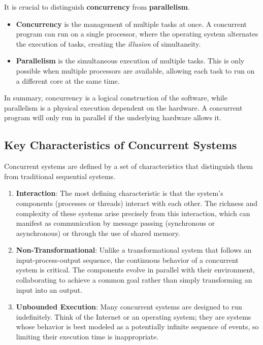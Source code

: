 It is crucial to distinguish \textbf{concurrency} from \textbf{parallelism}.
\begin{itemize}
    \item \textbf{Concurrency} is the management of multiple tasks at once. A concurrent program can run on a single processor, where the operating system alternates the execution of tasks, creating the \textit{illusion} of simultaneity.
    \item \textbf{Parallelism} is the simultaneous execution of multiple tasks. This is only possible when multiple processors are available, allowing each task to run on a different core at the same time.
\end{itemize}

In summary, concurrency is a logical construction of the software, while parallelism is a physical execution dependent on the hardware. A concurrent program will only run in parallel if the underlying hardware allows it.

\subsection{Key Characteristics of Concurrent Systems}

Concurrent systems are defined by a set of characteristics that distinguish them from traditional sequential systems.
\begin{enumerate}
    \item \textbf{Interaction}: The most defining characteristic is that the system's components (processes or threads) interact with each other. The richness and complexity of these systems arise precisely from this interaction, which can manifest as communication by message passing (synchronous or asynchronous) or through the use of shared memory.
    \item \textbf{Non-Transformational}: Unlike a transformational system that follows an input-process-output sequence, the continuous behavior of a concurrent system is critical. The components evolve in parallel with their environment, collaborating to achieve a common goal rather than simply transforming an input into an output.
    \item \textbf{Unbounded Execution}: Many concurrent systems are designed to run indefinitely. Think of the Internet or an operating system; they are systems whose behavior is best modeled as a potentially infinite sequence of events, so limiting their execution time is inappropriate.
\end{enumerate}

